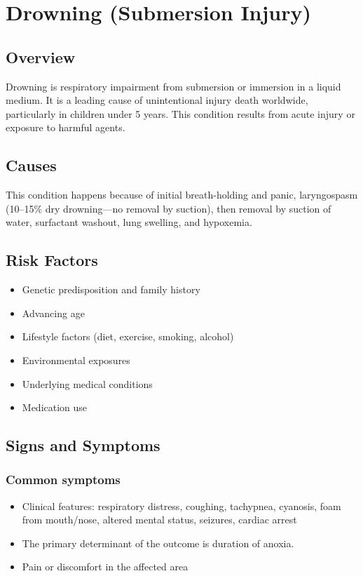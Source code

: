 \chapter{Drowning (Submersion Injury)}
\label{sec:Drowning}

\section{Overview}
Drowning is respiratory impairment from submersion or immersion in a liquid medium. It is a leading cause of unintentional injury death worldwide, particularly in children under 5 years. This condition results from acute injury or exposure to harmful agents.
\section{Causes}
This condition happens because of initial breath-holding and panic, laryngospasm (10--15\% dry drowning---no removal by suction), then removal by suction of water, surfactant washout, lung swelling, and hypoxemia.     
\section{Risk Factors}

\begin{itemize}[noitemsep]
  \item Genetic predisposition and family history
  \item Advancing age
  \item Lifestyle factors (diet, exercise, smoking, alcohol)
  \item Environmental exposures
  \item Underlying medical conditions
  \item Medication use
\end{itemize}
\section{Signs and Symptoms}

\subsection{Common symptoms}
\begin{itemize}[noitemsep]
  \item Clinical features: respiratory distress, coughing, tachypnea, cyanosis, foam from mouth/nose, altered mental status, seizures, cardiac arrest
  \item The primary determinant of the outcome is duration of anoxia.
  \item Pain or discomfort in the affected area
  \end{itemize}

